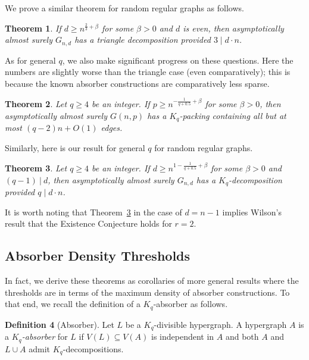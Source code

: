 \documentclass[11pt]{article}
\numberwithin{equation}{section}
\newcounter{i}
\theoremstyle{plain}
\newtheorem{thm}{Theorem}[section]
\theoremstyle{plain} %
\theoremstyle{definition}
\newtheorem{definition}[thm]{Definition}
\begin{document}
We prove a similar theorem for random regular graphs as follows. 

\begin{thm}\label{thm:YusterTriangleRegular}
If $d \ge n^{\frac{2}{3}+\beta}$ for some $\beta > 0$ and $d$ is even, then asymptotically almost surely $G_{n,d}$ has a triangle decomposition provided $3 \mid d \cdot n$.
\end{thm}


As for general $q$, we also make significant progress on these questions. Here the numbers are slightly worse than the triangle case (even comparatively); this is because the known absorber constructions are comparatively less sparse.

\begin{thm}\label{thm:YusterRandom}
Let $q \ge 4$ be an integer. If $p\ge n^{-\frac{1}{q+0.5}+\beta}$ for some $\beta > 0$, then asymptotically almost surely $G(n,p)$ has a $K_q$-packing containing all but at most $(q-2)n+O(1)$ edges. 
\end{thm}

Similarly, here is our result for general $q$ for random regular graphs.

\begin{thm}\label{thm:YusterRandomRegular}
Let $q \ge 4$ be an integer. If $d\ge n^{1-\frac{1}{q+0.5}+\beta}$ for some $\beta > 0$ and $(q-1)~|~d$, then asymptotically almost surely $G_{n,d}$ has a $K_q$-decomposition provided $q \mid d \cdot n$. 
\end{thm}

It is worth noting that Theorem~\ref{thm:YusterRandomRegular} in the case of $d=n-1$ implies Wilson's~\cite{WiI, WiII, WiIII} result that the Existence Conjecture holds for $r = 2$.


\subsection{Absorber Density Thresholds}

In fact, we derive these theorems as corollaries of more general results where the thresholds are in terms of the maximum density of absorber constructions. To that end, we recall the definition of a $K_q$-absorber as follows.

\begin{definition}[Absorber]
Let $L$ be a $K_q$-divisible hypergraph. A hypergraph $A$ is a \emph{$K_q$-absorber} for $L$ if $V(L)\subseteq V(A)$ is independent in $A$ and both $A$ and $L\cup A$ admit $K_q$-decompositions.
\end{definition}
\end{document}
